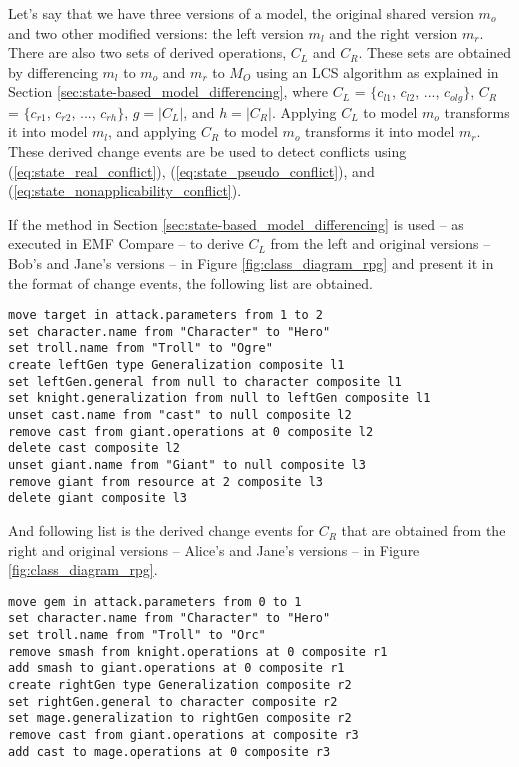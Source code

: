 Let's say that we have three versions of a model, the original shared version $m_{o}$ and two other modified versions: the left version $m_{l}$ and the right version $m_{r}$. There are also two sets of derived operations, $C_{L}$ and $C_{R}$. These sets are obtained by differencing $m_{l}$ to $m_{o}$ and $m_{r}$ to $M_{O}$ using an LCS algorithm as explained in Section \ref{sec:state-based_model_differencing}, where $C_{L}$ = $\{c_{l1}$, $c_{l2}$, ..., $c_{olg}\}$, $C_{R}$ = $\{c_{r1}$, $c_{r2}$, ..., $c_{rh}\}$, $g = |C_{L}|$, and $h = |C_{R}|$. Applying $C_{L}$ to model $m_{o}$ transforms it into model $m_{l}$, and applying $C_{R}$ to model $m_{o}$ transforms it into model $m_{r}$. These derived change events are be used to detect conflicts using (\ref{eq:state_real_conflict}), (\ref{eq:state_pseudo_conflict}), and (\ref{eq:state_nonapplicability_conflict}).  

If the method in Section \ref{sec:state-based_model_differencing} is used -- as executed in EMF Compare -- to derive $C_{L}$ from the left and original versions -- Bob's and Jane's versions -- in Figure \ref{fig:class_diagram_rpg} and present it in the format of change events, the following list are obtained. 
\begin{lstlisting}[firstnumber=1,style=eol,caption={The derived change events made by Bob to produce the right model in Figure \ref{fig:class_diagram_left} (right version).},label=lst:cbp_left_state]
move target in attack.parameters from 1 to 2
set character.name from "Character" to "Hero"
set troll.name from "Troll" to "Ogre"
create leftGen type Generalization composite l1
set leftGen.general from null to character composite l1
set knight.generalization from null to leftGen composite l1
unset cast.name from "cast" to null composite l2
remove cast from giant.operations at 0 composite l2
delete cast composite l2
unset giant.name from "Giant" to null composite l3
remove giant from resource at 2 composite l3
delete giant composite l3
\end{lstlisting}

And following list is the derived change events for $C_{R}$ that are obtained from the right and original versions -- Alice's and Jane's versions -- in Figure \ref{fig:class_diagram_rpg}. 
\begin{lstlisting}[firstnumber=1,style=eol,caption={The derived change events (operations) made by Alice to produce the right model in Figure \ref{fig:class_diagram_right} (right version).},label=lst:cbp_right_state]
move gem in attack.parameters from 0 to 1
set character.name from "Character" to "Hero"
set troll.name from "Troll" to "Orc"
remove smash from knight.operations at 0 composite r1
add smash to giant.operations at 0 composite r1
create rightGen type Generalization composite r2
set rightGen.general to character composite r2
set mage.generalization to rightGen composite r2
remove cast from giant.operations at composite r3
add cast to mage.operations at 0 composite r3
\end{lstlisting}

